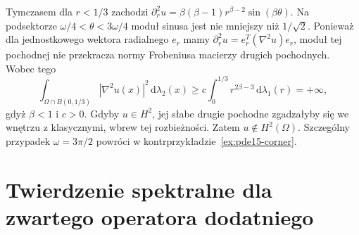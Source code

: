\begin{uwaga}
Tymczasem dla $r<1/3$ zachodzi
$\partial_r^2u=\beta(\beta-1)r^{\beta-2}\sin(\beta\theta)$.
Na podsektorze $\omega/4<\theta<3\omega/4$ moduł sinusa
jest nie mniejszy niż $1/\sqrt2$. Ponieważ dla jednostkowego
wektora radialnego $e_r$ mamy
$\partial_r^2u=e_r^T(\nabla^2u)e_r$,
moduł tej pochodnej nie przekracza normy Frobeniusa
macierzy drugich pochodnych. Wobec tego
\[
 \int_{\Omega\cap B(0,1/3)}|\nabla^2u(x)|^2\,\mathrm d\lambda_2(x)
 \ge c\int_0^{1/3}r^{2\beta-3}\,\mathrm d\lambda_1(r)
 =+\infty,
\]
gdyż $\beta<1$ i $c>0$. Gdyby $u\in H^2$, jej słabe
drugie pochodne zgadzałyby się we wnętrzu z klasycznymi,
wbrew tej rozbieżności. Zatem $u\notin H^2(\Omega)$.
Szczególny przypadek $\omega=3\pi/2$ powróci w
kontrprzykładzie~\ref{ex:pde15-corner}.
\end{uwaga}

\section{Twierdzenie spektralne dla zwartego operatora dodatniego}
\label{sec:pde12-compact-spectrum}

